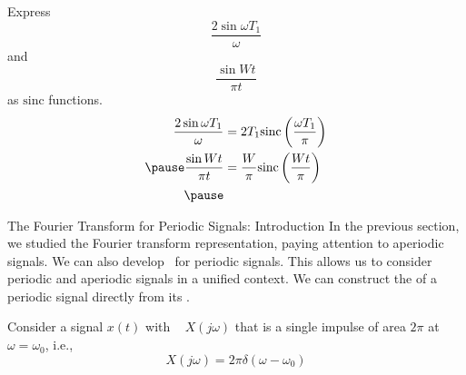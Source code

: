 \begin{frame}
    Express
    \begin{equation*}
        \frac{2 \sin \omega T_1}{\omega}
    \end{equation*}
    and
    \begin{equation*}
        \frac{\sin W t}{\pi t}
    \end{equation*}
    as $\mathrm{sinc}$ functions.
    \pause
    {
        \begin{equation*}
            \begin{aligned}
                \frac{2 \sin \omega T_1}{\omega} &= 2T_1 \mathrm{sinc}\left(\frac{\omega T_1}{\pi}\right)\\ \pause
                \frac{\sin W t}{\pi t} &= \frac{W}{\pi} \mathrm{sinc}\left(\frac{W t}{\pi}\right)\\ \pause
            \end{aligned}
        \end{equation*}
    }
\end{frame}


\begin{frame}{The Fourier Transform for Periodic Signals: Introduction}
    In the previous section, we studied the Fourier transform representation, paying attention to aperiodic signals. We can also develop \ftrs~for periodic signals. This allows us to consider periodic and aperiodic signals in a unified context. We can construct the \ft of a periodic signal directly from its \fsr .

    Consider a signal $x(t)$  with \ft~ $X(j\omega)$ that is a single impulse of area $2\pi$ at $\omega=\omega_0$, i.e.,
    \begin{equation}
        X(j\omega) = 2\pi \delta(\omega-\omega_0)
    \end{equation}
\end{frame}

